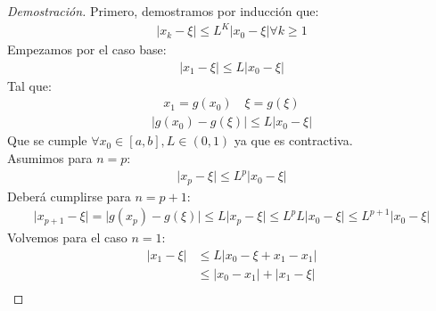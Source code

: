 \documentclass{article}
\begin{document}
\begin{proof}[Demostración]
    Primero, demostramos por inducción que:
    \begin{equation}
        \begin{split}
            |x_{k}-\xi | \leq L^{K} |x_{0}-\xi | \forall k \geq 1
        \end{split}
    \end{equation}
    Empezamos por el caso base:
    \begin{equation}
        \begin{split}
            |x_{1}-\xi | \leq L|x_{0}-\xi |
        \end{split}
    \end{equation}
    Tal que:
    \begin{equation}
        \begin{split}
            x_{1}=g(x_{0}) \quad \xi =g(\xi )
        \end{split}
    \end{equation}
    \begin{equation}
        \begin{split}
            \lvert g(x_{0})-g(\xi ) \rvert \leq L \lvert x_{0}-\xi  \rvert  
        \end{split}
    \end{equation}
    Que se cumple $\forall x_{0} \in [a,b], L \in (0,1)$ ya que es contractiva.\\
    Asumimos para $n=p$:
    \begin{equation}
        \begin{split}
            \lvert x_{p}-\xi  \rvert \leq L^{p}|x_{0}-\xi |
        \end{split}
    \end{equation}
    Deberá cumplirse para $n=p+1$:
    \begin{equation}
        \begin{split}
            \lvert x_{p+1}-\xi  \rvert = \lvert g(x_{p})-g(\xi ) \rvert \leq L\lvert x_{p}-\xi \rvert
            \leq L^{p}L \lvert x_{0}-\xi  \rvert\leq L^{p+1}\lvert x_{0}-\xi  \rvert   
        \end{split}
    \end{equation}
    Volvemos para el caso $n=1$:
    \begin{equation}
        \begin{split}
            \lvert x_{1}-\xi  \rvert &\leq L \lvert x_{0}-\xi +x_{1}-x_{1} \rvert\\
            &\leq \lvert x_{0}-x_{1} \rvert + \lvert x_{1}-\xi  \rvert\\

\end{split}
\end{equation}
\end{proof}
\end{document}
